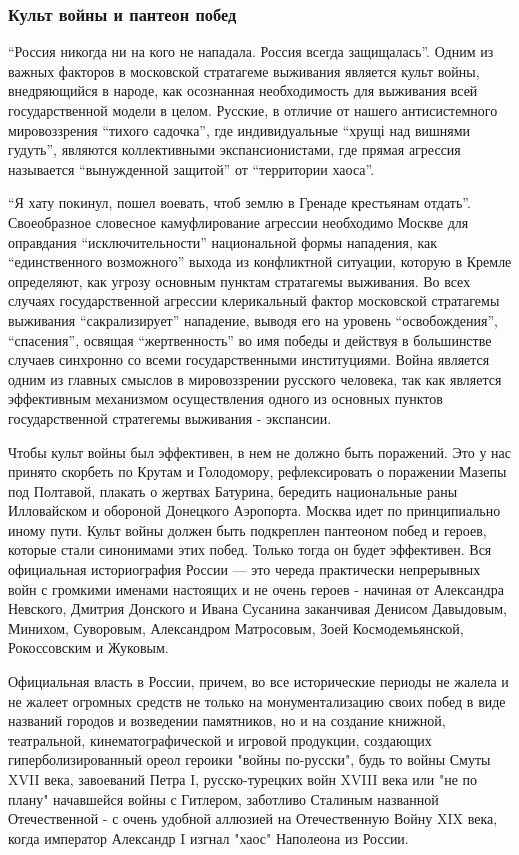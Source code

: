 \subsubsection{Культ войны и пантеон побед}

\enquote{Россия никогда ни на кого не нападала. Россия всегда защищалась}. Одним из
важных факторов в московской стратагеме выживания является культ войны,
внедряющийся в народе, как осознанная необходимость для выживания всей
государственной модели в целом. Русские, в отличие от нашего антисистемного
мировоззрения \enquote{тихого садочка}, где индивидуальные \enquote{хрущі над вишнями гудуть},
являются коллективными экспансионистами, где прямая агрессия называется
\enquote{вынужденной защитой} от \enquote{территории хаоса}.

\enquote{Я хату покинул, пошел воевать, чтоб землю в Гренаде крестьянам отдать}.
Своеобразное словесное камуфлирование агрессии необходимо Москве для оправдания
\enquote{исключительности} национальной формы нападения, как \enquote{единственного возможного}
выхода из конфликтной ситуации, которую в Кремле определяют, как угрозу
основным пунктам стратагемы выживания. Во всех случаях государственной агрессии
клерикальный фактор московской стратагемы выживания \enquote{сакрализирует} нападение,
выводя его на уровень \enquote{освобождения}, \enquote{спасения}, освящая \enquote{жертвенность} во имя
победы и действуя в большинстве случаев синхронно со всеми государственными
институциями. Война является одним из главных смыслов в мировоззрении русского
человека, так как является эффективным механизмом осуществления одного из
основных пунктов государственной стратегемы выживания - экспансии.

Чтобы культ войны был эффективен, в нем не должно быть поражений. Это у нас
принято скорбеть по Крутам и Голодомору, рефлексировать о поражении Мазепы под
Полтавой, плакать о жертвах Батурина, бередить национальные раны Илловайском и
обороной Донецкого Аэропорта. Москва идет по принципиально иному пути. Культ
войны должен быть подкреплен пантеоном побед и героев, которые стали синонимами
этих побед. Только тогда он будет эффективен. Вся официальная историография
России — это череда практически непрерывных войн с громкими именами настоящих и
не очень героев - начиная от Александра Невского, Дмитрия Донского и Ивана
Сусанина заканчивая Денисом Давыдовым, Минихом, Суворовым, Александром
Матросовым, Зоей Космодемьянской, Рокоссовским и Жуковым.

Официальная власть в России, причем, во все исторические периоды не жалела и не
жалеет огромных средств не только на монументализацию своих побед в виде
названий городов и возведении памятников, но и на создание книжной,
театральной, кинематографической и игровой продукции, создающих
гиперболизированный ореол героики "войны по-русски", будь то войны Смуты XVII
века, завоеваний Петра I, русско-турецких войн XVIII века или "не по плану"
начавшейся войны с Гитлером, заботливо Сталиным названной Отечественной - с
очень удобной аллюзией на Отечественную Войну XIX века, когда император
Александр I изгнал "хаос" Наполеона из России.

